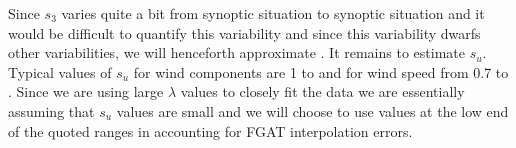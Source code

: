 \documentclass[12pt,titlepage]{article}
\begin{document}
Since $s_3$ varies quite a bit from synoptic situation to synoptic
situation and it would be difficult to quantify this variability and
since this variability dwarfs other variabilities, we will henceforth
approximate .
It remains to estimate $s_u$.
Typical values of $s_u$ for wind components are 1 to  and for
wind speed from 0.7 to .
Since we are using large $\lambda$ values to closely fit the data we
are essentially assuming that $s_u$ values are small and we will
choose to use values at the low end of the quoted ranges in accounting
for FGAT interpolation errors.



\end{document}
